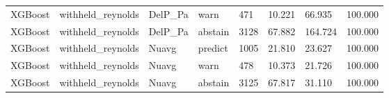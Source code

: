 \begin{tabular}{llllllll}
XGBoost & withheld_reynolds & DelP_Pa & warn & 471 & 10.221 & 66.935 & 100.000 \\
XGBoost & withheld_reynolds & DelP_Pa & abstain & 3128 & 67.882 & 164.724 & 100.000 \\
XGBoost & withheld_reynolds & Nuavg & predict & 1005 & 21.810 & 23.627 & 100.000 \\
XGBoost & withheld_reynolds & Nuavg & warn & 478 & 10.373 & 21.726 & 100.000 \\
XGBoost & withheld_reynolds & Nuavg & abstain & 3125 & 67.817 & 31.110 & 100.000 \\
\hline
\end{tabular}
